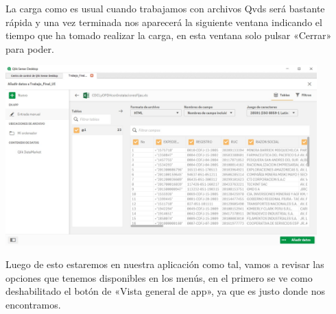 La carga como es usual cuando trabajamos con archivos Qvds será bastante rápida y una vez terminada nos aparecerá la siguiente ventana indicando el tiempo que ha tomado realizar la carga, en esta ventana solo pulsar «Cerrar» para poder.

\begin{center}
	\includegraphics[width=12cm]{./Imagenes/img12} 
\end{center}

Luego de esto estaremos en nuestra aplicación como tal, vamos a revisar las opciones que tenemos disponibles en los menús, en el primero se ve como deshabilitado el botón de «Vista general de app», ya que es justo donde nos encontramos.
